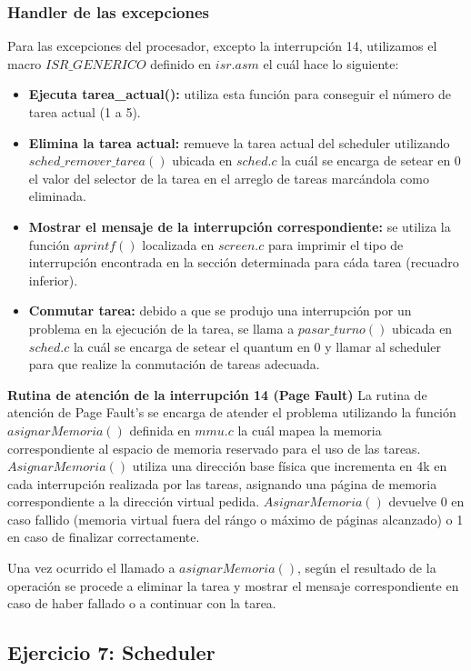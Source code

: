 \documentclass[a4paper,10pt,twoside]{article}
\begin{document}
\subsubsection{Handler de las excepciones}
Para las excepciones del procesador, excepto la interrupción 14, utilizamos el macro $ISR\_GENERICO$ definido en $isr.asm$ el cuál hace lo siguiente:
\begin{itemize}
\item \textbf{Ejecuta tarea\_actual():} utiliza esta función para conseguir el número de tarea actual (1 a 5).
\item \textbf{Elimina la tarea actual:} remueve la tarea actual del scheduler utilizando $sched\_remover\_tarea()$ ubicada en $sched.c$ la cuál se encarga de setear en 0 el valor del selector de la tarea en el arreglo de tareas marcándola como eliminada.
\item \textbf{Mostrar el mensaje de la interrupción correspondiente:} se utiliza la función $aprintf()$ localizada en $screen.c$ para imprimir el tipo de interrupción encontrada en la sección determinada para cáda tarea (recuadro inferior).
\item \textbf{Conmutar tarea:} debido a que se produjo una interrupción por un problema en la ejecución de la tarea, se llama a $pasar\_turno()$ ubicada en $sched.c$ la cuál se encarga de setear el quantum en 0 y llamar al scheduler para que realize la conmutación de tareas adecuada.
\end{itemize}

\textbf{Rutina de atención de la interrupción 14 (Page Fault)}
La rutina de atención de Page Fault's se encarga de atender el problema utilizando la función $asignarMemoria()$ definida en $mmu.c$ la cuál mapea la memoria correspondiente al espacio de memoria reservado para el uso de las tareas. $AsignarMemoria()$ utiliza una dirección base física que incrementa en 4k en cada interrupción realizada por las tareas, asignando una página de memoria correspondiente a la dirección virtual pedida. $AsignarMemoria()$ devuelve 0 en caso fallido (memoria virtual fuera del rángo o máximo de páginas alcanzado) o 1 en caso de finalizar correctamente.

Una vez ocurrido el llamado a $asignarMemoria()$, según el resultado de la operación se procede a eliminar la tarea y mostrar el mensaje correspondiente en caso de haber fallado o a continuar con la tarea.



\subsection{Ejercicio 7: Scheduler}
\end{document}
